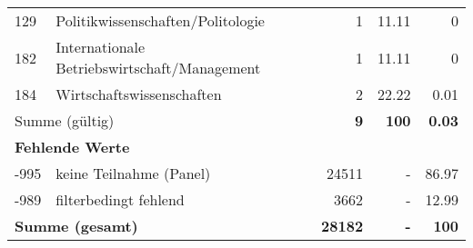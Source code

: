 \begin{longtable}{lXrrr}
     129 &
     \multicolumn{1}{X}{ Politikwissenschaften/Politologie   } &


       \num{1} &
       \num[round-mode=places,round-precision=2]{11.11} &
         \num[round-mode=places,round-precision=2]{0} \\

     182 &
     \multicolumn{1}{X}{ Internationale Betriebswirtschaft/Management   } &


       \num{1} &
       \num[round-mode=places,round-precision=2]{11.11} &
         \num[round-mode=places,round-precision=2]{0} \\

     184 &
     \multicolumn{1}{X}{ Wirtschaftswissenschaften   } &


       \num{2} &
       \num[round-mode=places,round-precision=2]{22.22} &
         \num[round-mode=places,round-precision=2]{0.01} \\
     \midrule
     \multicolumn{2}{l}{Summe (gültig)} &
       \textbf{\num{9}} &
     \textbf{100} &
       \textbf{\num[round-mode=places,round-precision=2]{0.03}} \\
     \multicolumn{5}{l}{\textbf{Fehlende Werte}}\\
       -995 &
       keine Teilnahme (Panel) &
         \num{24511} &
        - &
         \num[round-mode=places,round-precision=2]{86.97} \\
       -989 &
       filterbedingt fehlend &
         \num{3662} &
        - &
         \num[round-mode=places,round-precision=2]{12.99} \\
     \midrule
     \multicolumn{2}{l}{\textbf{Summe (gesamt)}} &
          \textbf{\num{28182}} &
        \textbf{-} &
        \textbf{100} \\
     \bottomrule
     \end{longtable}
     
